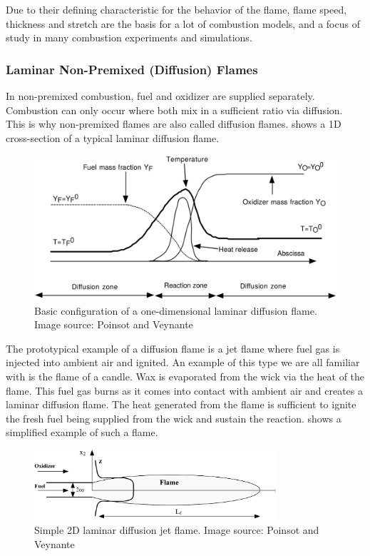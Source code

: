 %
Due to their defining characteristic for the behavior of the flame, flame speed,
thickness and stretch are the basis for a lot of combustion models, and a focus
of study in many combustion experiments and simulations.
%
%
\subsubsection{Laminar Non-Premixed (Diffusion) Flames} %
\label{ssub:laminar_diffusion_flames}
%
In non-premixed combustion, fuel and oxidizer are supplied separately.
%
Combustion can only occur where both mix in a sufficient ratio via diffusion.
%
This is why non-premixed flames are also called diffusion flames.
%
 shows a \ac{1D} cross-section of a
typical laminar diffusion flame.
%
\begin{figure}[t]
    \centering
    \includegraphics[width=\textwidth]{figures/laminar_diffusion_flame.png}
    \caption{Basic configuration of a one-dimensional laminar diffusion flame.
    Image source: Poinsot and Veynante~\cite{Poinsot2012}}
    \label{fig:laminar_diffusion_profiles}
\end{figure}
%

%
The prototypical example of a diffusion flame is a jet flame where fuel gas is
injected into ambient air and ignited.
%
An example of this type we are all familiar with is the flame of a candle.
%
Wax is evaporated from the wick via the heat of the flame.
%
This fuel gas burns as it comes into contact with ambient air and creates a
laminar diffusion flame.
%
The heat generated from the flame is sufficient to ignite the fresh fuel being
supplied from the wick and sustain the reaction.
%
 shows a simplified example of such a flame.
%
\begin{figure}[t]
    \centering
    \includegraphics[width=0.8\textwidth]{figures/laminar_diffusion_jet.png}
    \caption{Simple \ac{2D} laminar diffusion jet flame. Image source: Poinsot
    and Veynante~\cite{Poinsot2012}}
    \label{fig:laminar_diffusion_jet}
\end{figure}
%

